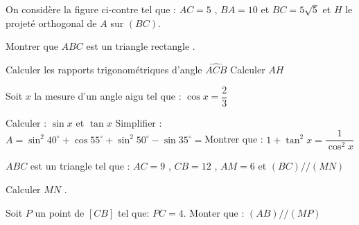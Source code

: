 \documentclass[a4paper,addpoints,12pt]{exam}
\begin{document}
\begin{exo}[7]
On considère la figure ci-contre tel que : $AC=5$ , $BA=10$ et $BC=5\sqrt{5}$ et $H$  le projeté orthogonal de $A$ sur $(BC)$.
\begin{questions}
\question[1] Montrer que $ABC$ est un triangle rectangle .\droppoints
\begin{minipage}{0.6\linewidth}
\anserline[5]
\end{minipage}%
\begin{minipage}{0.4\linewidth}
\end{minipage}
\question[2] Calculer les rapports trigonométriques d'angle $\widehat{ACB}$\droppoints
\anserline[3]
\question[1] Calculer $AH$\droppoints
\anserline[3]
\end{questions}
Soit $x$ la mesure d'un angle aigu tel que : $\cos x =\dfrac{2}{3}$
\begin{questions}
\setcounter{question}{3}
\question[1] Calculer : $\sin x$ et $\tan x$\droppoints
\anserline[4]
\question[1] Simplifier  :\droppoints
$A = \sin^{2}40^{\circ} +\cos55^{\circ} +\sin^{2}50^{\circ}-\sin35^{\circ} =$\anserline[3]
\question[1] Montrer que : $1+\tan^{2}x = \dfrac{1}{\cos^{2}x}$\droppoints
\anserline[4]
\end{questions}
\end{exo}

\begin{exo}[2]
$ABC$ est un triangle tel que : $AC=9$ , $CB=12$ , $AM=6$  et $(BC)//(MN)$
\begin{questions}
\question[1] Calculer  $MN$ .\droppoints
\begin{minipage}{0.5\linewidth}
\anserline[6]
\end{minipage}
\begin{minipage}{0.5\linewidth}
\end{minipage}
\anserline[3]
\question[1] Soit $P$ un point de $[CB] $ tel que: $PC=4$.
Monter que : $(AB)//(MP)$\droppoints
\anserline[8]
\end{questions}
\end{exo}
\end{document}
